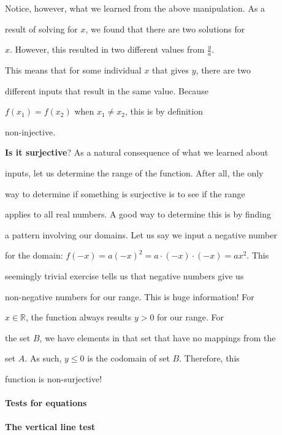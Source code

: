 Notice, however, what we learned from the above manipulation. As a

result of solving for $x$, we found that there are two solutions for

$x$. However, this resulted in two different values from $\frac{y}{a}$.

This means that for some individual $x$ that gives $y$, there are two

different inputs that result in the same value. Because

$f(x_{1})=f(x_{2})$ when $x_{1}\ne x_{2}$, this is by definition

non-injective.



\textbf{Is it surjective}? As a natural consequence of what we learned about

inputs, let us determine the range of the function. After all, the only

way to determine if something is surjective is to see if the range

applies to all real numbers. A good way to determine this is by finding

a pattern involving our domains. Let us say we input a negative number

for the domain: $f(-x)=a(-x)^{2}=a\cdot(-x)\cdot(-x)=ax^2$. This

seemingly trivial exercise tells us that negative numbers give us

non-negative numbers for our range. This is huge information! For

$x\in\mathbb{R}$, the function always results $y>0$ for our range. For

the set $B$, we have elements in that set that have no mappings from the

set $A$. As such, $y\le0$ is the codomain of set $B$. Therefore, this

function is non-surjective! 



\paragraph{Tests for equations}



\paragraph{The vertical line test}



